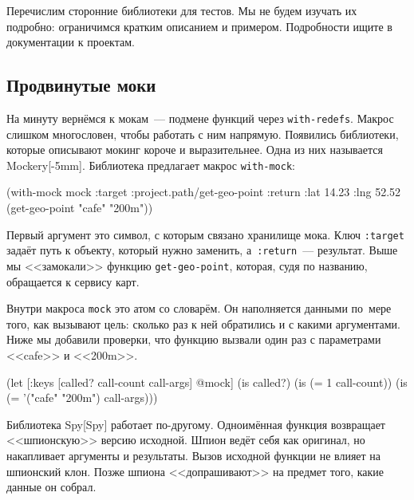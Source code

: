 Перечислим сторонние библиотеки для тестов. Мы не будем изучать их подробно:
ограничимся кратким описанием и примером. Подробности ищите в документации к
проектам.

\subsection{Продвинутые моки}


На минуту вернёмся к мокам~--- подмене функций через \verb|with-redefs|. Макрос
слишком многословен, чтобы работать с ним напрямую. Появились библиотеки,
которые описывают мокинг короче и выразительнее. Одна из них называется
Mockery[-5mm].  Библиотека предлагает
макрос \verb|with-mock|:

\begin{english}
  \begin{clojure}
(with-mock mock
  {:target :project.path/get-geo-point
   :return {:lat 14.23 :lng 52.52}}
  (get-geo-point "cafe" "200m"))
  \end{clojure}
\end{english}

Первый аргумент это символ, с которым связано хранилище мока. Ключ \verb|:target|
задаёт путь к объекту, который нужно заменить, а~\verb|:return|~---
результат. Выше мы <<замокали>> функцию \verb|get-geo-point|, которая, судя по
названию, обращается к сервису карт.

Внутри макроса \verb|mock| это атом со словарём. Он наполняется данными по~мере
того, как вызывают цель: сколько раз к ней обратились и с какими
аргументами. Ниже мы добавили проверки, что функцию вызвали один раз с
параметрами <<cafe>> и <<200m>>.

\begin{english}
  \begin{clojure}
(let [{:keys [called? call-count call-args]} @mock]
  (is called?)
  (is (= 1 call-count))
  (is (= '("cafe" "200m") call-args)))
  \end{clojure}
\end{english}


Библиотека Spy[Spy] работает
по-другому. Одноимённая функция возвращает <<шпионскую>> версию исходной. Шпион
ведёт себя как оригинал, но накапливает аргументы и результаты. Вызов исходной
функции не влияет на шпионский клон. Позже шпиона <<допрашивают>> на предмет
того, какие данные он собрал.

